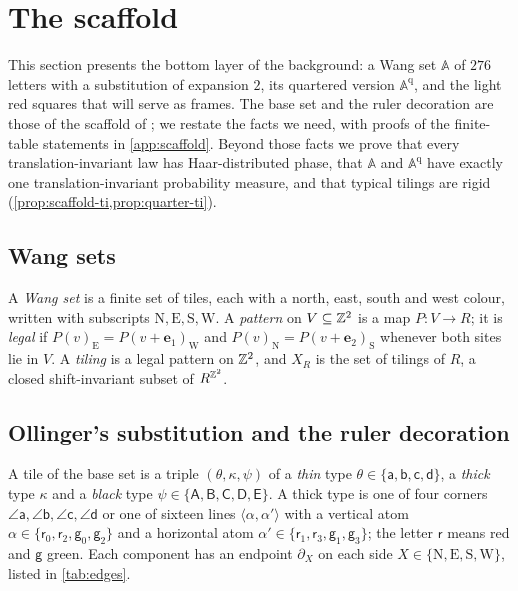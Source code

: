 \section{The scaffold}\label{sec:scaffold}

This section presents the bottom layer of the background: a Wang set $\mathbb A$ of $276$ letters with a substitution of expansion $2$, its quartered version $\mathbb A^{\mathrm q}$, and the light red squares that will serve as frames. The base set and the ruler decoration are those of the scaffold of \cite{DM26forget}; we restate the facts we need, with proofs of the finite-table statements in \cref{app:scaffold}. Beyond those facts we prove that every translation-invariant law has Haar-distributed phase, that $\mathbb A$ and $\mathbb A^{\mathrm q}$ have exactly one translation-invariant probability measure, and that typical tilings are rigid (\cref{prop:scaffold-ti,prop:quarter-ti}).

\subsection{Wang sets}

A \emph{Wang set} is a finite set of tiles, each with a north, east, south and west colour, written with subscripts $\mathrm N,\mathrm E,\mathrm S,\mathrm W$. A \emph{pattern} on $V\subseteq\mathbb{Z}^2$ is a map $P\colon V\to R$; it is \emph{legal} if $P(v)_{\mathrm E}=P(v+\mathbf e_1)_{\mathrm W}$ and $P(v)_{\mathrm N}=P(v+\mathbf e_2)_{\mathrm S}$ whenever both sites lie in $V$. A \emph{tiling} is a legal pattern on $\mathbb{Z}^2$, and $X_R$ is the set of tilings of $R$, a closed shift-invariant subset of $R^{\mathbb{Z}^2}$.

\subsection{Ollinger's substitution and the ruler decoration}\label{scf:sub-base}

A tile of the base set is a triple $(\theta,\kappa,\psi)$ of a \emph{thin} type $\theta\in\{\mathsf a,\mathsf b,\mathsf c,\mathsf d\}$, a \emph{thick} type $\kappa$ and a \emph{black} type $\psi\in\{\mathsf A,\mathsf B,\mathsf C,\mathsf D,\mathsf E\}$. A thick type is one of four corners $\angle\mathsf a,\angle\mathsf b,\angle\mathsf c,\angle\mathsf d$ or one of sixteen lines $\langle\alpha,\alpha'\rangle$ with a vertical atom $\alpha\in\{\mathsf r_0,\mathsf r_2,\mathsf g_0,\mathsf g_2\}$ and a horizontal atom $\alpha'\in\{\mathsf r_1,\mathsf r_3,\mathsf g_1,\mathsf g_3\}$; the letter $\mathsf r$ means red and $\mathsf g$ green. Each component has an endpoint $\partial_X$ on each side $X\in\{\mathrm N,\mathrm E,\mathrm S,\mathrm W\}$, listed in \cref{tab:edges}.

